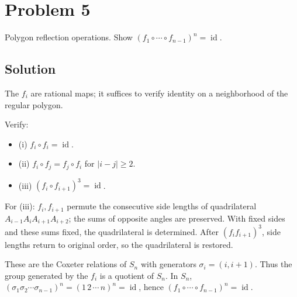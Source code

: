 \documentclass{article}
\begin{document}
\section*{Problem 5}
Polygon reflection operations. Show $(f_1 \circ \cdots \circ f_{n-1})^n = \operatorname{id}$.

\subsection*{Solution}
The $f_i$ are rational maps; it suffices to verify identity on a neighborhood of the regular polygon.

Verify:
\begin{itemize}
  \item (i) $f_i \circ f_i = \operatorname{id}$.
  \item (ii) $f_i \circ f_j = f_j \circ f_i$ for $|i - j| \ge 2$.
  \item (iii) $(f_i \circ f_{i+1})^3 = \operatorname{id}$.
\end{itemize}
For (iii): $f_i, f_{i+1}$ permute the consecutive side lengths of quadrilateral $A_{i-1} A_i A_{i+1} A_{i+2}$; the sums of opposite angles are preserved. With fixed sides and these sums fixed, the quadrilateral is determined. After $(f_i f_{i+1})^3$, side lengths return to original order, so the quadrilateral is restored.

These are the Coxeter relations of $S_n$ with generators $\sigma_i = (i, i+1)$. Thus the group generated by the $f_i$ is a quotient of $S_n$. In $S_n$, $(\sigma_1 \sigma_2 \cdots \sigma_{n-1})^n = (1\,2\,\cdots\,n)^n = \operatorname{id}$, hence $(f_1 \circ \cdots \circ f_{n-1})^n = \operatorname{id}$.
\end{document}
